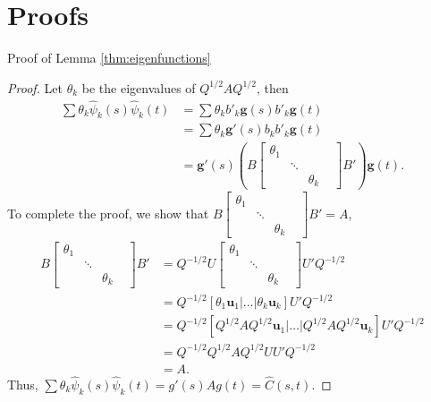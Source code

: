 \section{Proofs} \label{ch2:proofs}
Proof of Lemma \ref{thm:eigenfunctions}
\begin{proof}
Let $\theta_k$ be the eigenvalues of $Q^{1/2}AQ^{1/2}$, then
\begin{align*}
	\sum \theta_k \hat{\psi}_k(s)\hat{\psi}_k(t) &= \sum \theta_kb'_k\mathbf{g}(s)b'_k\mathbf{g}(t) \\
							&= \sum \theta_k\mathbf{g}'(s)b_kb'_k\mathbf{g}(t) \\
							&= \mathbf{g}'(s)\left( B  \begin{bmatrix}
								\theta_1 &  &  &\\
								&  \ddots &\\
								&  & \theta_k
							      \end{bmatrix} B' \right) \mathbf{g}(t).
\end{align*}
To complete the proof, we show that $B  \begin{bmatrix}
								\theta_1 &  &  &\\
								&  \ddots &\\
								&  & \theta_k
							      \end{bmatrix} B'=A$,
\begin{align*}
	B \begin{bmatrix}
							\theta_1 &  &  &\\
								&  \ddots &\\
								&  & \theta_k
							      \end{bmatrix} B' &= Q^{-1/2}U  \begin{bmatrix}
								\theta_1 &  &  &\\
								&  \ddots &\\
								&  & \theta_k
							      \end{bmatrix} U'Q^{-1/2}\\
							     &= Q^{-1/2}[\theta_1\mathbf{u}_1| \dots  |\theta_k\mathbf{u}_k] U'Q^{-1/2}\\
							     &= Q^{-1/2}[Q^{1/2}AQ^{1/2}\mathbf{u}_1| \dots| Q^{1/2}AQ^{1/2}\mathbf{u}_k] U'Q^{-1/2}\\
							     &= Q^{-1/2}Q^{1/2}AQ^{1/2}U U'Q^{-1/2}\\
							     &= A. 
\end{align*}
Thus, $\sum \theta_k \hat{\psi}_k(s)\hat{\psi}_k(t) = g'(s)Ag(t) = \hat{C}(s,t)$. \qedhere
\end{proof}


